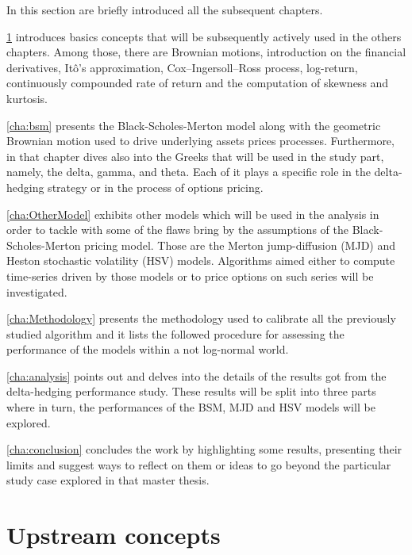 \documentclass[12pt,a4paper]{report}
\begin{document}
In this section are briefly introduced all the subsequent chapters.

\cref{cha:upstream} introduces basics concepts that will be subsequently actively used in the others chapters. Among those, there are Brownian motions, introduction on the financial derivatives, Itô's approximation, Cox–Ingersoll–Ross process, log-return, continuously compounded rate of return and the computation of skewness and kurtosis.

\cref{cha:bsm} presents the Black-Scholes-Merton model along with the geometric Brownian motion used to drive underlying assets prices processes. Furthermore, in that chapter dives also into the Greeks that will be used in the study part, namely, the delta, gamma, and theta. Each of it plays a specific role in the delta-hedging strategy or in the process of options pricing.

\cref{cha:OtherModel} exhibits other models which will be used in the analysis in order to tackle with some of the flaws bring by the assumptions of the Black-Scholes-Merton pricing model. Those are the Merton jump-diffusion (MJD) and Heston stochastic volatility (HSV) models. Algorithms aimed either to compute time-series driven by those models or to price options on such series will be investigated.

\cref{cha:Methodology} presents the methodology used to calibrate all the previously studied algorithm and it lists the followed procedure for assessing the performance of the models within a not log-normal world. 

\cref{cha:analysis} points out and delves into the details of the results got from the delta-hedging performance study. These results will be split into three parts where in turn, the performances of the BSM, MJD and HSV models will be explored.

\cref{cha:conclusion} concludes the work by highlighting some results, presenting their limits and suggest ways to reflect on them or ideas to go beyond the particular study case explored in that master thesis.


%
%
\chapter{Upstream concepts}
\label{cha:upstream}


\end{document}
